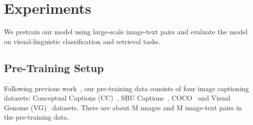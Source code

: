 \documentclass{article}
\begin{document}
\section{Experiments}
\label{sec:exp}

We pretrain our model using large-scale image-text pairs and evaluate the model on visual-linguistic classification and retrieval tasks.

\subsection{Pre-Training Setup}
\label{sec:pretraining:setup}

Following previous work~\citep{uniter,vilt}, our pre-training data consists of four image captioning datasets: Conceptual Captions (CC)~\citep{gcc}, SBU Captions~\citep{sbu}, COCO~\citep{coco} and Visual Genome (VG)~\citep{vg} datasets.
There are about M images and M image-text pairs in the pre-training data.
\end{document}
